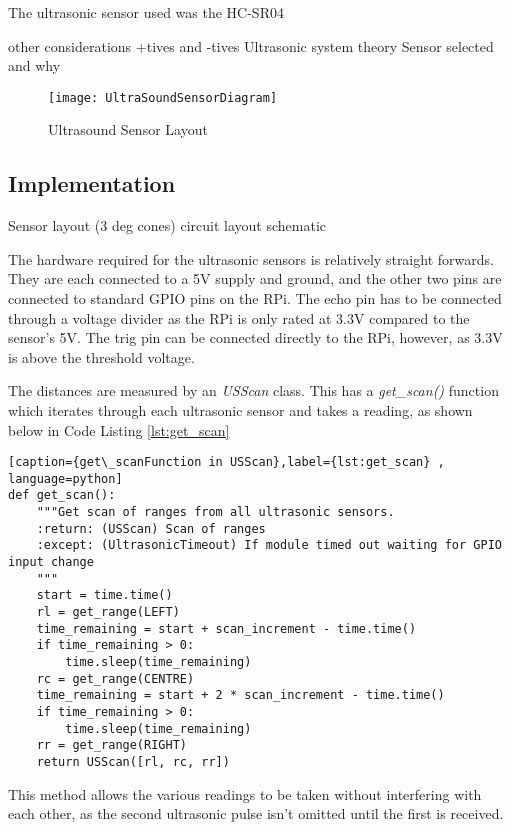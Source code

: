 The ultrasonic sensor used was the HC-SR04

other considerations +tives and -tives
Ultrasonic system theory
Sensor selected and why

\begin{figure}[!ht]
	\centering
	\texttt{[image: UltraSoundSensorDiagram]}
	\caption{Ultrasound Sensor Layout}\label{UltraSoundSensorDiagram}

\end{figure}

\subsection{Implementation}\label{elec/range/impl}
Sensor layout (3 deg cones) 
circuit layout
schematic

The hardware required for the ultrasonic sensors is relatively straight forwards. They are each connected to a 5V supply and ground, and the other two pins are connected to standard GPIO pins on the RPi. The echo pin has to be connected through a voltage divider as the RPi is only rated at 3.3V compared to the sensor's 5V. The trig pin can be connected directly to the RPi, however, as 3.3V is above the threshold voltage.

The distances are measured by an \textit{USScan} class. This has a \textit{get\_scan()} function which iterates through each ultrasonic sensor and takes a reading, as shown below in Code Listing \ref{lst:get_scan}

\begin{lstlisting}[caption={get\_scanFunction in USScan},label={lst:get_scan} , language=python]
def get_scan():
    """Get scan of ranges from all ultrasonic sensors.
    :return: (USScan) Scan of ranges
    :except: (UltrasonicTimeout) If module timed out waiting for GPIO input change
    """
    start = time.time()
    rl = get_range(LEFT)
    time_remaining = start + scan_increment - time.time()
    if time_remaining > 0:
        time.sleep(time_remaining)
    rc = get_range(CENTRE)
    time_remaining = start + 2 * scan_increment - time.time()
    if time_remaining > 0:
        time.sleep(time_remaining)
    rr = get_range(RIGHT)
    return USScan([rl, rc, rr])
\end{lstlisting}

This method allows the various readings to be taken without interfering with each other, as the second ultrasonic pulse isn't omitted until the first is received. 

